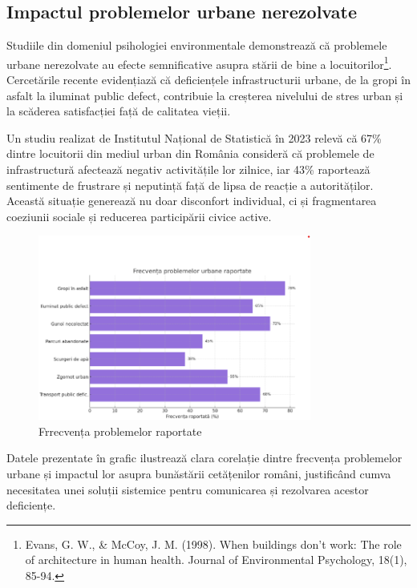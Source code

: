 \documentclass[12pt,a4paper]{report}
\begin{document}
\vspace{0.5cm}

\subsection{Impactul problemelor urbane nerezolvate}

Studiile din domeniul psihologiei environmentale demonstrează că problemele urbane nerezolvate au efecte semnificative asupra stării de bine a locuitorilor\footnote{Evans, G. W., \& McCoy, J. M. (1998). When buildings don't work: The role of architecture in human health. Journal of Environmental Psychology, 18(1), 85-94.}. Cercetările recente evidențiază că deficiențele infrastructurii urbane, de la gropi în asfalt la iluminat public defect, contribuie la creșterea nivelului de stres urban și la scăderea satisfacției față de calitatea vieții.

Un studiu realizat de Institutul Național de Statistică în 2023 relevă că 67\% dintre locuitorii din mediul urban din România consideră că problemele de infrastructură afectează negativ activitățile lor zilnice, iar 43\% raportează sentimente de frustrare și neputință față de lipsa de reacție a autorităților. Această situație generează nu doar disconfort individual, ci și fragmentarea coeziunii sociale și reducerea participării civice active.

\begin{figure}[H]
    \centering
    \includegraphics[width=0.8\textwidth]{frecventa problemelor raportate.png}
    \caption{Frrecvența problemelor raportate}
    \label{fig:frecvența problemelor raportate}
\end{figure}

Datele prezentate în grafic ilustrează clara corelație dintre frecvența problemelor urbane și impactul lor asupra bunăstării cetățenilor români, justificând cumva necesitatea unei soluții sistemice pentru comunicarea și rezolvarea acestor deficiențe.
\end{document}
